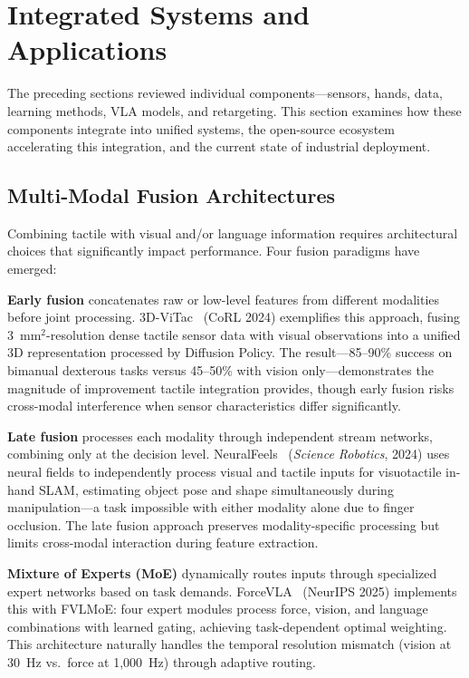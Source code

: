 \section{Integrated Systems and Applications}
\label{sec:systems}

The preceding sections reviewed individual components---sensors, hands, data, learning methods, VLA models, and retargeting. This section examines how these components integrate into unified systems, the open-source ecosystem accelerating this integration, and the current state of industrial deployment.

\subsection{Multi-Modal Fusion Architectures}

Combining tactile with visual and/or language information requires architectural choices that significantly impact performance. Four fusion paradigms have emerged:

\textbf{Early fusion} concatenates raw or low-level features from different modalities before joint processing. 3D-ViTac~\cite{huang2024vitac} (CoRL 2024) exemplifies this approach, fusing 3~mm$^2$-resolution dense tactile sensor data with visual observations into a unified 3D representation processed by Diffusion Policy. The result---85--90\% success on bimanual dexterous tasks versus 45--50\% with vision only---demonstrates the magnitude of improvement tactile integration provides, though early fusion risks cross-modal interference when sensor characteristics differ significantly.

\textbf{Late fusion} processes each modality through independent stream networks, combining only at the decision level. NeuralFeels~\cite{suresh2024neuralfeels} (\emph{Science Robotics}, 2024) uses neural fields to independently process visual and tactile inputs for visuotactile in-hand SLAM, estimating object pose and shape simultaneously during manipulation---a task impossible with either modality alone due to finger occlusion. The late fusion approach preserves modality-specific processing but limits cross-modal interaction during feature extraction.

\textbf{Mixture of Experts (MoE)} dynamically routes inputs through specialized expert networks based on task demands. ForceVLA~\cite{yu2025forcevla} (NeurIPS 2025) implements this with FVLMoE: four expert modules process force, vision, and language combinations with learned gating, achieving task-dependent optimal weighting. This architecture naturally handles the temporal resolution mismatch (vision at 30~Hz vs.\ force at 1{,}000~Hz) through adaptive routing.

